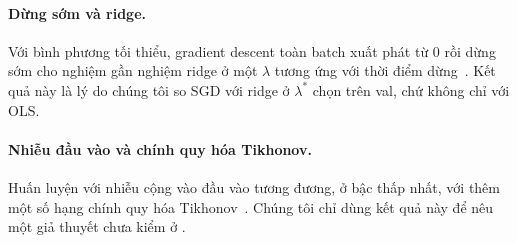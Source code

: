 \paragraph{Dừng sớm và ridge.} Với bình phương tối thiểu, gradient descent toàn batch xuất phát từ $0$ rồi dừng sớm cho nghiệm gần nghiệm ridge ở một $\lambda$ tương ứng với thời điểm dừng~\cite{ali2019continuous}. Kết quả này là lý do chúng tôi so SGD với ridge ở $\lambda^*$ chọn trên val, chứ không chỉ với OLS.

\paragraph{Nhiễu đầu vào và chính quy hóa Tikhonov.} Huấn luyện với nhiễu cộng vào đầu vào tương đương, ở bậc thấp nhất, với thêm một số hạng chính quy hóa Tikhonov~\cite{bishop1995training}. Chúng tôi chỉ dùng kết quả này để nêu một giả thuyết chưa kiểm ở .

